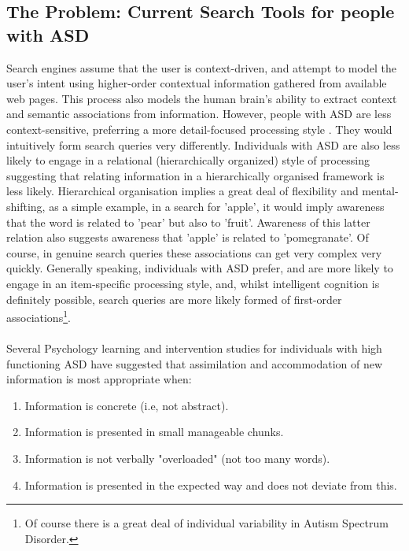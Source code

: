 \documentclass[10pt]{article}
\begin{document}
\subsection{The Problem: Current Search Tools for people with ASD}
Search engines assume that the user is context-driven, and attempt to model the user's intent using higher-order contextual information gathered from available web pages. This process also models the human brain's ability to extract context and semantic associations from information. However, people with ASD are less context-sensitive, preferring a more detail-focused processing style \cite{mottron}. They would intuitively form search queries very differently. Individuals with ASD are also less likely to engage in a relational (hierarchically organized) style of processing \cite{bowler} suggesting that relating information in a hierarchically organised framework is less likely. Hierarchical organisation implies a great deal of flexibility and mental-shifting, as a simple example, in a search for 'apple', it would imply awareness that the word is related to 'pear' but also to 'fruit'. Awareness of this latter relation also suggests awareness that 'apple' is related to 'pomegranate'. Of course, in genuine search queries these associations can get very complex very quickly. Generally speaking, individuals with ASD prefer, and are more likely to engage in an item-specific processing style, and, whilst intelligent cognition is definitely possible, search queries are more likely formed of first-order associations\footnote{Of course there is a great deal of individual variability in Autism Spectrum Disorder.}. \\
\\Several Psychology learning and intervention studies for individuals with high functioning ASD have suggested that assimilation and accommodation of new information is most appropriate when:\\
\begin{enumerate}
\item Information is concrete (i.e, not abstract).\\
\item Information is presented in small manageable chunks.\\
\item Information is not verbally "overloaded" (not too many words).\\
\item Information is presented in the expected way and does not deviate from this.\\
\end{enumerate}
\end{document}
